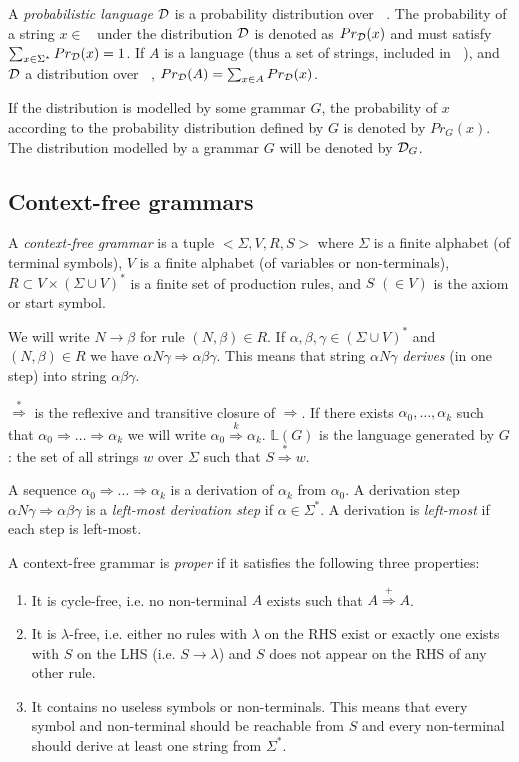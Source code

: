 \documentclass[submission]{eptcs} \usepackage{breakurl}             \usepackage[english]{babel}
\providecommand{\rgives}{\ensuremath{\stackrel{*}{\Longrightarrow}}}
\providecommand{\es}{\ensuremath{\lambda}}
\providecommand{\Naming}{\ensuremath{\mathbb L}}
\providecommand{\Prob}{\ensuremath{Pr}}
\providecommand{\Dis}{\ensuremath{{\cal{D}}}}
\providecommand{\Sigmastar}{\ensuremath{\mathop{\Sigma^{\star}}}}
\begin{document}
A \emph{probabilistic language} $\Dis$
is a probability distribution over $\Sigmastar$.
The probability of a string $x \in \Sigmastar$ under the
distribution $\Dis$ is denoted as
$\Prob_{\Dis}(x)$\label{index:prob}
and must satisfy $\sum_{x \in \Sigmastar} \Prob_{\Dis}(x) = 1$.
If $A$ is a language (thus a set of strings, included in $\Sigmastar$),
and $\Dis$ a distribution over $\Sigmastar$,
$\Prob_{\Dis}(A)=\sum_{x\in A} \Prob_{\Dis}(x)$.


If the distribution is modelled by some grammar $G$,
the probability of $x$ according to the probability distribution
defined by $G$ is denoted by
$\Prob_{G}(x)$. The distribution modelled by a grammar $G$ will
be denoted by ${\Dis}_{G}$.


\subsection{Context-free grammars}

A \emph{context-free grammar} is a tuple $<\Sigma, V, R,
S>$ where $\Sigma$ is a finite alphabet (of terminal symbols), $V$
is a finite alphabet (of variables or non-terminals), $R\subset V
\times (\Sigma \cup V)^*$ is a finite set of production rules, and
$S$ $(\in V)$ is the axiom or start symbol.


We will write $N\rightarrow \beta$ for rule $(N, \beta)\in R$. If
$\alpha,\beta,\gamma \in(\Sigma\cup V)^*$ and  $(N, \beta)\in R$ we have
$\alpha N\gamma\Rightarrow\alpha\beta\gamma$. This means that string $\alpha N\gamma$
\emph{derives} (in one step) into string $\alpha\beta\gamma$.

$\rgives$
is the reflexive and transitive closure of $\Rightarrow$. If there
exists $\alpha_0,\dots,\alpha_k$ such that $\alpha_0 \Rightarrow \dots \Rightarrow \alpha_k$ we will
write $\alpha_0 \stackrel{k}{\Rightarrow} \alpha_k$. $\Naming(G)$ is the language generated by $G$: the set of all strings $w$ over $\Sigma$ such that $S\rgives w$.

A sequence $\alpha_0 \Rightarrow \dots \Rightarrow \alpha_k$ is a derivation of $\alpha_k$ from $\alpha_0$. A derivation step $\alpha N\gamma\Rightarrow\alpha\beta\gamma$ is a \emph{left-most derivation step} if $\alpha\in \Sigma^*$. A derivation is \emph{left-most} if each step is left-most.

A context-free grammar is \emph{proper} if it satisfies the following three properties:
\begin{enumerate}
\item It is cycle-free, i.e. no non-terminal $A$ exists such that $A\stackrel{+}{\Longrightarrow}A$.
\item It is $\es$-free, i.e. either no rules with $\es$ on the RHS exist or exactly one exists with $S$ on the LHS (i.e. $S \rightarrow \es$) and $S$ does not appear on the RHS of any other rule.
\item It contains no useless symbols or non-terminals. This means that every symbol and non-terminal should be reachable from $S$ and every non-terminal should derive at least one string from $\Sigma^*$.
\end{enumerate}
\end{document}
